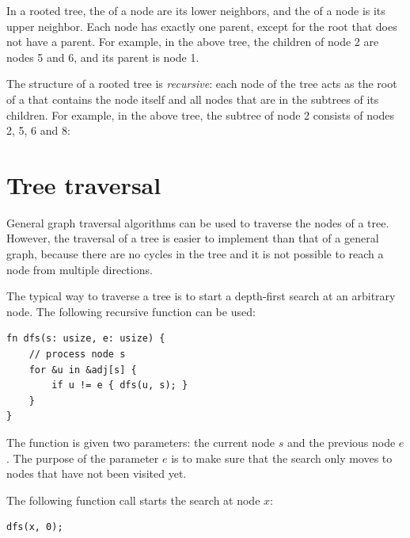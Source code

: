 In a rooted tree, the  of a node
are its lower neighbors, and the  of a node
is its upper neighbor.
Each node has exactly one parent,
except for the root that does not have a parent.
For example, in the above tree,
the children of node 2 are nodes 5 and 6,
and its parent is node 1.


The structure of a rooted tree is \emph{recursive}:
each node of the tree acts as the root of a 
that contains the node itself and all nodes
that are in the subtrees of its children.
For example, in the above tree, the subtree of node 2
consists of nodes 2, 5, 6 and 8:
\begin{center}
\end{center}

\section{Tree traversal}

General graph traversal algorithms
can be used to traverse the nodes of a tree.
However, the traversal of a tree is easier to implement than
that of a general graph, because
there are no cycles in the tree and it is not
possible to reach a node from multiple directions.

The typical way to traverse a tree is to start
a depth-first search at an arbitrary node.
The following recursive function can be used:

\begin{lstlisting}
fn dfs(s: usize, e: usize) {
    // process node s
    for &u in &adj[s] {
        if u != e { dfs(u, s); }
    }
}
\end{lstlisting}

The function is given two parameters: the current node $s$
and the previous node $e$.
The purpose of the parameter $e$ is to make sure
that the search only moves to nodes
that have not been visited yet.

The following function call starts the search
at node $x$:

\begin{lstlisting}
dfs(x, 0);
\end{lstlisting}

